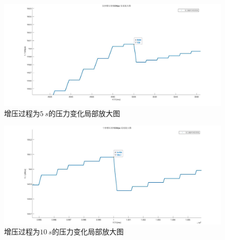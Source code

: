 \documentclass[withoutpreface,bwprint]{cumcmthesis} %
\begin{document}
    \begin{figure}[H]
        \begin{floatrow}
    \end{floatrow}
    \end{figure}


    \begin{figure}[!h]
    \centering
    \includegraphics[width=.85\textwidth]{5s_m.jpg}
    \caption{增压过程为$5~s$的压力变化局部放大图}
    \label{figure7}
    \end{figure}
 
    \begin{figure}[htbp]
    \centering
    \includegraphics[width=.85\textwidth]{10s_m.jpg}
    \caption{增压过程为$10~s$的压力变化局部放大图}
    \label{figure8}
    \end{figure}    
\end{document}
